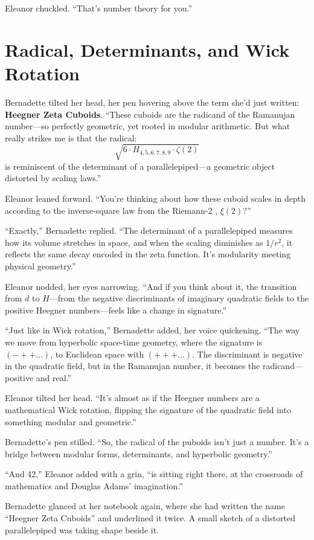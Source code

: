 Eleanor chuckled. “That’s number theory for you.”

\section*{Radical, Determinants, and Wick Rotation}

Bernadette tilted her head, her pen hovering above the term she’d just written: \textbf{Heegner Zeta Cuboids}. “These cuboids are the radicand of the Ramanujan number—so perfectly geometric, yet rooted in modular arithmetic. But what really strikes me is that the radical:
\[
\sqrt{6 \cdot H_{4,5,6,7,8,9} \cdot \zeta(2)}
\]
is reminiscent of the determinant of a parallelepiped—a geometric object distorted by scaling laws.”

Eleanor leaned forward. “You’re thinking about how these cuboid scales in depth according to the inverse-square law from the Riemann-2 , \(\xi(2)\)?”

“Exactly,” Bernadette replied. “The determinant of a parallelepiped measures how its volume stretches in space, and when the scaling diminishes as \(1/r^2\), it reflects the same decay encoded in the zeta function. It’s modularity meeting physical geometry.”

Eleanor nodded, her eyes narrowing. “And if you think about it, the transition from \(d\) to \(H\)—from the negative discriminants of imaginary quadratic fields to the positive Heegner numbers—feels like a change in signature.”

“Just like in Wick rotation,” Bernadette added, her voice quickening. “The way we move from hyperbolic space-time geometry, where the signature is \((-++\dots)\), to Euclidean space with \((+++\dots)\). The discriminant is negative in the quadratic field, but in the Ramanujan number, it becomes the radicand—positive and real.”

Eleanor tilted her head. “It’s almost as if the Heegner numbers are a mathematical Wick rotation, flipping the signature of the quadratic field into something modular and geometric.”

Bernadette’s pen stilled. “So, the radical of the puboids isn’t just a number. It’s a bridge between modular forms, determinants, and hyperbolic geometry.”

“And 42,” Eleanor added with a grin, “is sitting right there, at the crossroads of mathematics and Douglas Adams’ imagination.”

Bernadette glanced at her notebook again, where she had written the name “Heegner Zeta Cuboids” and underlined it twice. A small sketch of a distorted parallelepiped was taking shape beside it.

